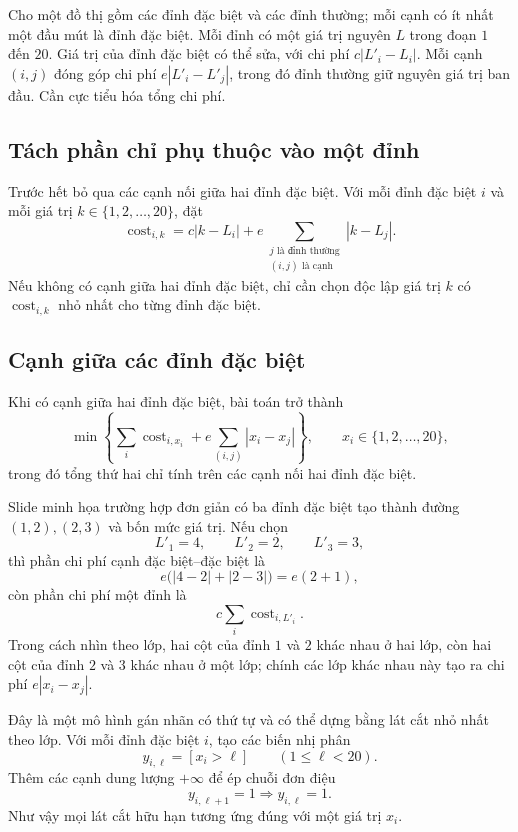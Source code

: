 \documentclass[11pt]{article}
\begin{document}
Cho một đồ thị gồm các đỉnh đặc biệt và các đỉnh thường; mỗi cạnh có ít nhất
một đầu mút là đỉnh đặc biệt. Mỗi đỉnh có một giá trị nguyên $L$ trong đoạn
$1$ đến $20$. Giá trị của đỉnh đặc biệt có thể sửa, với chi phí
$c|L'_i-L_i|$. Mỗi cạnh $(i,j)$ đóng góp chi phí $e|L'_i-L'_j|$, trong đó
đỉnh thường giữ nguyên giá trị ban đầu. Cần cực tiểu hóa tổng chi phí.

\subsection*{Tách phần chỉ phụ thuộc vào một đỉnh}

Trước hết bỏ qua các cạnh nối giữa hai đỉnh đặc biệt. Với mỗi đỉnh đặc biệt
$i$ và mỗi giá trị $k\in\{1,2,\ldots,20\}$, đặt
\[
  \operatorname{cost}_{i,k}
  = c|k-L_i|+
  e\sum_{\substack{j\text{ là đỉnh thường}\\ (i,j)\text{ là cạnh}}}
    |k-L_j|.
\]
Nếu không có cạnh giữa hai đỉnh đặc biệt, chỉ cần chọn độc lập giá trị $k$ có
\(\operatorname{cost}_{i,k}\) nhỏ nhất cho từng đỉnh đặc biệt.

\subsection*{Cạnh giữa các đỉnh đặc biệt}

Khi có cạnh giữa hai đỉnh đặc biệt, bài toán trở thành
\[
  \min \left\{
    \sum_i \operatorname{cost}_{i,x_i}
    + e\sum_{(i,j)} |x_i-x_j|
  \right\},
  \qquad x_i\in\{1,2,\ldots,20\},
\]
trong đó tổng thứ hai chỉ tính trên các cạnh nối hai đỉnh đặc biệt.

Slide minh họa trường hợp đơn giản có ba đỉnh đặc biệt tạo thành đường
\((1,2),(2,3)\) và bốn mức giá trị. Nếu chọn
\[
  L'_1=4,\qquad L'_2=2,\qquad L'_3=3,
\]
thì phần chi phí cạnh đặc biệt--đặc biệt là
\[
  e\bigl(|4-2|+|2-3|\bigr)=e(2+1),
\]
còn phần chi phí một đỉnh là
\[
  c\sum_i \operatorname{cost}_{i,L'_i}.
\]
Trong cách nhìn theo lớp, hai cột của đỉnh \(1\) và \(2\) khác nhau ở hai
lớp, còn hai cột của đỉnh \(2\) và \(3\) khác nhau ở một lớp; chính các lớp
khác nhau này tạo ra chi phí \(e|x_i-x_j|\).

Đây là một mô hình gán nhãn có thứ tự và có thể dựng bằng lát cắt nhỏ nhất
theo lớp. Với mỗi đỉnh đặc biệt $i$, tạo các biến nhị phân
\[
  y_{i,\ell}=[x_i>\ell]\qquad (1\le \ell<20).
\]
Thêm các cạnh dung lượng $+\infty$ để ép chuỗi đơn điệu
\[
  y_{i,\ell+1}=1\Rightarrow y_{i,\ell}=1.
\]
Như vậy mọi lát cắt hữu hạn tương ứng đúng với một giá trị $x_i$.
\end{document}
